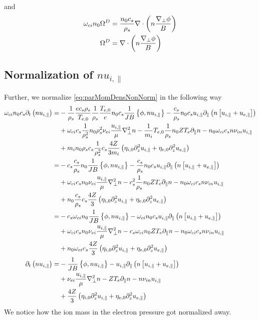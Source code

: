 %
and
%
\begin{align*}
    \omega_{ci}n_0\Omega^D &= \frac{n_0 c_s}{\rho_s}\nabla\cdot\left(n\frac{\nabla_\perp\phi}{B}\right)\\
    \Omega^D &= \nabla\cdot\left(n\frac{\nabla_\perp\phi}{B}\right)
\end{align*}
%

\subsection{Normalization of \texorpdfstring{$nu_{i,\|}$}{the parallel momentum density}}
%
Further, we normalize \cref{eq:parMomDensNonNorm} in the following way
%
\begin{align*}
    \omega_{ci}n_0c_s\partial_t\left( n u_{i,\|}\right)
 =&
 -\frac{1}{\rho_s}\frac{ec_s\rho_s}{T_{e,0}}\frac{1}{\rho_s}\frac{T_{e,0}}{e}n_0c_s\frac{1}{JB}\left\{\phi, n u_{i,\|}\right\}
 - \frac{c_s}{\rho_s}n_0c_s u_{i,\|}\partial_\|\left( n \left[u_{i,\|}+ u_{e,\|} \right]\right)
   \\&
 + \omega_{ci}c_s\frac{1}{\rho_s^2}n_0\rho_s^2\nu_{ei} \frac{u_{i,\|}}{\mu} \nabla_\perp^2 n
 - \frac{1}{m_i}T_{e,0}\frac{1}{\rho_s}n_0ZT_e \partial_\| n
 - n_0\omega_{ci}c_s n \nu_{i n}u_{i,\|}
   \\&
   + m_in_0\rho_sc_s\frac{1}{\rho_s^2}c_s\frac{4Z}{3m_i}\left(\eta_{i,0} \partial_z^2 u_{i,\|}
 + \eta_{e,0}\partial_z^2 u_{e,\|}\right)
 \\
 =&
 - c_s\frac{c_s}{\rho_s}n_0\frac{1}{JB}\left\{\phi, n u_{i,\|}\right\}
 - \frac{c_s}{\rho_s}n_0c_s u_{i,\|}\partial_\|\left( n \left[u_{i,\|}+ u_{e,\|} \right]\right)
   \\&
 + \omega_{ci}c_sn_0\nu_{ei} \frac{u_{i,\|}}{\mu} \nabla_\perp^2 n
 - c_s^2\frac{1}{\rho_s}n_0ZT_e \partial_\| n
 - n_0\omega_{ci}c_s n \nu_{i n}u_{i,\|}
   \\&
   + n_0\frac{c_s}{\rho_s}c_s\frac{4Z}{3}\left(\eta_{i,0} \partial_z^2 u_{i,\|}
 + \eta_{e,0}\partial_z^2 u_{e,\|}\right)
 \\
 =&
 - c_s\omega_{ci}n_0\frac{1}{JB}\left\{\phi, n u_{i,\|}\right\}
 - \omega_{ci}n_0c_s u_{i,\|}\partial_\|\left( n \left[u_{i,\|}+ u_{e,\|} \right]\right)
   \\&
 + \omega_{ci}c_sn_0\nu_{ei} \frac{u_{i,\|}}{\mu} \nabla_\perp^2 n
 - c_s\omega_{ci}n_0ZT_e \partial_\| n
 - n_0\omega_{ci}c_s n \nu_{i n}u_{i,\|}
   \\&
   + n_0\omega_{ci}c_s\frac{4Z}{3}\left(\eta_{i,0} \partial_z^2 u_{i,\|}
 + \eta_{e,0}\partial_z^2 u_{e,\|}\right)
 \\
  \partial_t\left( n u_{i,\|}\right)
 =&
 - \frac{1}{JB}\left\{\phi, n u_{i,\|}\right\}
 - u_{i,\|}\partial_\|\left( n \left[u_{i,\|}+ u_{e,\|} \right]\right)
   \\&
 + \nu_{ei} \frac{u_{i,\|}}{\mu} \nabla_\perp^2 n
 - ZT_e \partial_\| n
 - n \nu_{i n}u_{i,\|}
   \\&
   + \frac{4Z}{3}\left(\eta_{i,0} \partial_z^2 u_{i,\|}
 + \eta_{e,0}\partial_z^2 u_{e,\|}\right)
\end{align*}
%
We notice how the ion mass in the electron pressure got normalized away.

